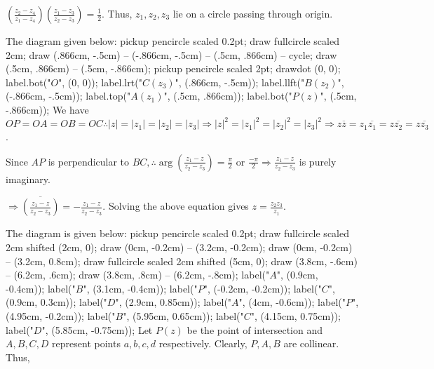  $\left(\frac{z_2 - z_4}{z_1 - z_4}\right)\left(\frac{z_1 - z_3}{z_2 - z_3}\right) = \frac{1}{2}$.
  Thus, $z_1, z_2, z_3$ lie on a circle passing through origin.
\item The diagram given below:
  \startplacefigure[location={left,none}]
    \startMPcode
      pickup pencircle scaled 0.2pt;
      draw fullcircle scaled 2cm;
      draw (.866cm, -.5cm) -- (-.866cm, -.5cm) -- (.5cm, .866cm) -- cycle;
      draw (.5cm, .866cm) -- (.5cm, -.866cm);
      pickup pencircle scaled 2pt;
      drawdot (0, 0);
      label.bot("$O$", (0, 0));
      label.lrt("$C(z_3)$", (.866cm, -.5cm));
      label.llft("$B(z_2)$", (-.866cm, -.5cm));
      label.top("$A(z_1)$", (.5cm, .866cm));
      label.bot("$P(z)$", (.5cm, -.866cm));
    \stopMPcode
  \stopplacefigure
  We have $OP=OA=OB=OC \therefore |z| = |z_1| = |z_2| = |z_3| \Rightarrow |z|^2 = |z_1|^2 = |z_2|^2 =
  |z_3|^2 \Rightarrow z\overline{z} = z_1\overline{z_1} = z\overline{z_2} = z\overline{z_3}$.

  Since $AP$ is perpendicular to $BC, \therefore\arg\left(\frac{z_1 - z}{z_2 - z_3}\right) = \frac{\pi}{2}$
  or $\frac{-\pi}{2}\Rightarrow \frac{z_1 - z}{z_2 - z_3}$ is purely imaginary.

  $\Rightarrow \overline{\left(\frac{z_1 - z}{z_2 - z_3}\right)} = -\frac{z_1 - z}{z_2 - z_3}$.
  Solving the above equation gives $z = \frac{z_2z_3}{z_1}$.
\item The diagram is given below:
  \startplacefigure[location={left,none}]
    \startMPcode
      pickup pencircle scaled 0.2pt;
      draw fullcircle scaled 2cm shifted (2cm, 0);
      draw (0cm, -0.2cm) -- (3.2cm, -0.2cm);
      draw (0cm, -0.2cm) -- (3.2cm, 0.8cm);
      draw fullcircle scaled 2cm shifted (5cm, 0);
      draw (3.8cm, -.6cm) -- (6.2cm, .6cm);
      draw (3.8cm, .8cm) -- (6.2cm, -.8cm);
      label("$A$", (0.9cm, -0.4cm));
      label("$B$", (3.1cm, -0.4cm));
      label("$P$", (-0.2cm, -0.2cm));
      label("$C$", (0.9cm, 0.3cm));
      label("$D$", (2.9cm, 0.85cm));
      label("$A$", (4cm, -0.6cm));
      label("$P$", (4.95cm, -0.2cm));
      label("$B$", (5.95cm, 0.65cm));
      label("$C$", (4.15cm, 0.75cm));
      label("$D$", (5.85cm, -0.75cm));
    \stopMPcode
  \stopplacefigure
  Let $P(z)$ be the point of intersection and $A, B, C, D$ represent points $a, b, c, d$ respectively. Clearly, $P, A, B$ are
  collinear. Thus,

